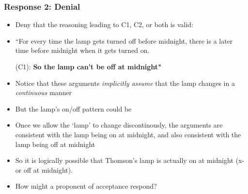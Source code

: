 \begin{frame}
\frametitle{Response 2: Denial}

\begin{itemize}[<+->]

\item Deny that the reasoning leading to C1, C2, or both is valid:

\item \small{``For every time the lamp gets turned off before midnight, there is a later time before midnight when it gets turned on.} 
\item[(C1):] \small{\textbf{So the lamp can't be off at midnight"}}

\item Notice that these arguments \textit{implicitly assume} that the lamp changes in a \emph{continuous} manner

\item But the lamp's on/off pattern could be 

\item Once we allow the `lamp' to change discontinously, the arguments are consistent with the lamp being on at midnight, and also consistent with the lamp being off at midnight

\item So it is logically possible that Thomson's lamp is actually on at midnight (x-or off at midnight). %

\item How might a proponent of acceptance respond?

\end{itemize}
\end{frame}

